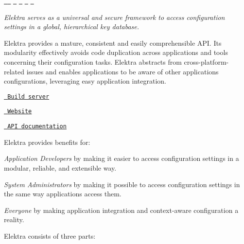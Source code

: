 \href{https://github.com/ElektraInitiative/libelektra/releases/latest}{\texttt{ }} \href{https://build.libelektra.org/job/libelektra/job/master/lastBuild}{\texttt{ }} \href{https://travis-ci.org/ElektraInitiative/libelektra}{\texttt{ }} \href{https://cirrus-ci.com/github/ElektraInitiative/libelektra}{\texttt{ }} \href{https://coveralls.io/github/ElektraInitiative/libelektra}{\texttt{ }} \href{https://lgtm.com/projects/g/ElektraInitiative/libelektra/alerts}{\texttt{ }}

{\itshape Elektra serves as a universal and secure framework to access configuration settings in a global, hierarchical key database.}



Elektra provides a mature, consistent and easily comprehensible A\+PI. Its modularity effectively avoids code duplication across applications and tools concerning their configuration tasks. Elektra abstracts from cross-\/platform-\/related issues and enables applications to be aware of other applications\textquotesingle{} configurations, leveraging easy application integration.


\begin{DoxyItemize}
\item \href{https://build.libelektra.org/}{\texttt{ Build server}}
\item \href{https://www.libelektra.org}{\texttt{ Website}}
\item \href{https://doc.libelektra.org/api/latest/html/}{\texttt{ A\+PI documentation}}
\end{DoxyItemize}

Elektra provides benefits for\+:


\begin{DoxyEnumerate}
\item {\itshape Application Developers} by making it easier to access configuration settings in a modular, reliable, and extensible way.
\item {\itshape System Administrators} by making it possible to access configuration settings in the same way applications access them.
\item {\itshape Everyone} by making application integration and context-\/aware configuration a reality.
\end{DoxyEnumerate}

Elektra consists of three parts\+:


